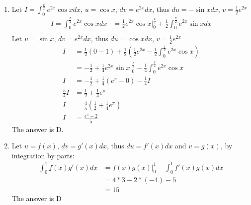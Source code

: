 \documentclass{article}
\numberwithin{equation}{section}
\begin{document}
\begin{enumerate}
    \item Let $I = \displaystyle \int_{0}^{\frac{\pi}{2}} e^{2x}\cos x dx$, $u = \cos x$, $dv = e^{2x}dx$, thus $ du = -\sin x dx$, $v = \frac{1}{2}e^{2x}$
    \begin{align*}
        I = \int_{0}^{\frac{\pi}{2}} e^{2x}\cos x dx &= \frac{1}{2}e^{2x} \cos x \Big|_0^{\frac{\pi}{2}} + \frac{1}{2}\int_{0}^{\frac{\pi}{2}} e^{2x} \sin x dx\\
    \end{align*}
    Let $u = \sin x$, $dv = e^{2x}dx$, thus $du = \cos x dx$, $v = \frac{1}{2}e^{2x}$
    \begin{align*}
        I &= \frac{1}{2} (0-1) + \frac{1}{2} \left(\frac{1}{2}e^{2x} - \frac{1}{2}\int_{0}^{\frac{\pi}{2}} e^{2x}\cos x\right)\\
        &= -\frac{1}{2} + \frac{1}{4}e^{2x} \sin x \Big|_0^{\frac{\pi}{2}} - \frac{1}{4} \int_{0}^{\frac{\pi}{2}} e^{2x} \cos x\\
        I &= -\frac{1}{2} + \frac{1}{4}(e^\pi - 0) - \frac{1}{4} I\\
        \frac{5}{4} I &= \frac{1}{2} + \frac{1}{4}e^\pi\\
        I &= \frac{4}{5} \left(\frac{1}{2} + \frac{1}{4} e^\pi\right)\\
        I &= \frac{e^\pi - 2}{5}
    \end{align*}
    The answer is D.

    \item Let $u = f(x)$, $dv = g'(x) dx$, thus $du = f'(x)dx$ and $v = g(x)$, by integration by parts:
    \begin{align*}
        \int_{0}^{1} f(x)g'(x)dx &= f(x)g(x)\Big|_0^1 - \int_{0}^{1} f'(x)g(x) dx\\
        &= 4*3 - 2*(-4) - 5\\
        &= 15
    \end{align*}
    The answer is D
\end{enumerate}
\end{document}
